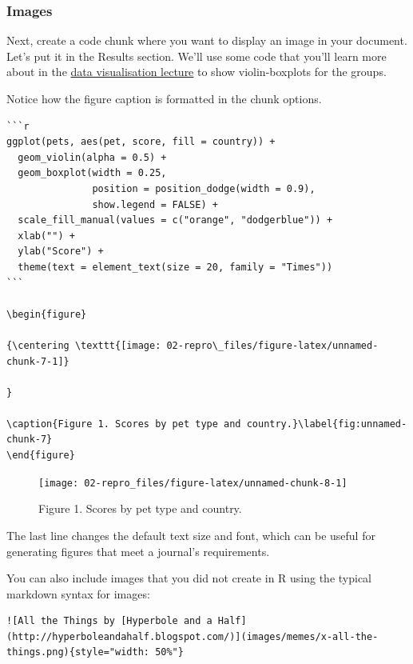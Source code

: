 \documentclass[
  oneside]{book}
\begin{document}
\hypertarget{images}{%
\subsubsection{Images}\label{images}}

Next, create a code chunk where you want to display an image in your document. Let's put it in the Results section. We'll use some code that you'll learn more about in the \protect\hyperlink{ggplot}{data visualisation lecture} to show violin-boxplots for the groups.

Notice how the figure caption is formatted in the chunk options.

\begin{verbatim}
```r
ggplot(pets, aes(pet, score, fill = country)) +
  geom_violin(alpha = 0.5) +
  geom_boxplot(width = 0.25, 
               position = position_dodge(width = 0.9),
               show.legend = FALSE) +
  scale_fill_manual(values = c("orange", "dodgerblue")) +
  xlab("") +
  ylab("Score") +
  theme(text = element_text(size = 20, family = "Times"))
```

\begin{figure}

{\centering \texttt{[image: 02-repro\_files/figure-latex/unnamed-chunk-7-1]} 

}

\caption{Figure 1. Scores by pet type and country.}\label{fig:unnamed-chunk-7}
\end{figure}
\end{verbatim}

\begin{figure}

{\centering \texttt{[image: 02-repro\_files/figure-latex/unnamed-chunk-8-1]} 

}

\caption{Figure 1. Scores by pet type and country.}\label{fig:unnamed-chunk-8}
\end{figure}

\begin{info}
The last line changes the default text size and font, which can be useful for generating figures that meet a journal's requirements.

\end{info}

You can also include images that you did not create in R using the typical markdown syntax for images:

\begin{verbatim}
![All the Things by [Hyperbole and a Half](http://hyperboleandahalf.blogspot.com/)](images/memes/x-all-the-things.png){style="width: 50%"}
\end{verbatim}
\end{document}
